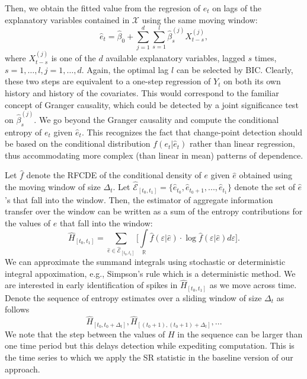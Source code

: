 Then, we obtain the fitted value from the regresion of $e_t$ on lags of the explanatory variables contained in $\mathcal{X}$ using the same moving window: 
\begin{equation}\label{eq:granger}
        \hat{e}_t = \hat{\beta}_0 + \sum\limits_{j=1}^{d}\sum\limits_{s=1}^{l} \hat{\beta}^{(j)}_{s}X_{t-s}^{(j)},
    \end{equation}
where $X_{t-s}^{(j)}$ is one of the $d$ available explanatory variables, lagged $s$ times, $s=1, \ldots, l, j=1, \ldots, d$. Again, the optimal lag $l$ can be selected by BIC. Clearly, these two steps are equivalent to a one-step regression of $Y_t$ on both its own history and history of the covariates. This would correspond to the familiar concept of Granger causality, which could be detected by a joint significance test on  $\hat{\beta}^{(j)}_{s}$.
We go beyond the Granger causality and compute the conditional entropy of $e_t$ given $\hat{e}_t$. This recognizes the fact that change-point detection should be based on the conditional distribution $f(e_t|\hat{e}_t)$ rather than linear regression, thus accommodating more complex (than linear in mean) patterns of dependence. 

Let $\hat{f}$ denote the RFCDE of the conditional density of $e$ given $\hat{e}$ obtained using the moving window of size $\Delta_t$. Let  $\hat{\mathcal{E}}_{[t_0, t_1]} = \{\hat{e}_{t_0}, \hat{e}_{t_0+1}, ..., \hat{e}_{t_1}  \}$ denote the set of $\hat{e}$'s that fall into the window. Then, the estimator of aggregate information transfer over the window can be written as a sum of the entropy contributions for the values of $\hat{e}$ that fall into the window: 
 \begin{equation}\label{eq:simpson}
        \hat{H}_{[t_0, t_1]} = \sum\limits_{\hat{e} \in \hat{\mathcal{E}}_{[t_0, t_1]}} \bigg[\int\limits_{\mathbb{R}}  \hat{f}(\varepsilon| \hat{e}) \cdot \log \hat{f}(\varepsilon| \hat{e}) d \varepsilon\bigg].
    \end{equation}
We can approximate the summand integrals using stochastic or deterministic integral appoximation, e.g., Simpson's rule which is a deterministic method. We are interested in early identification of spikes in $\hat{H}_{[t_0, t_1]}$ as we move across time. Denote the sequence of entropy estimates over a sliding window of size $\Delta_t$ as follows
    \begin{equation*}
        \hat{H}_{[t_0, t_0 + \Delta_t]}, \hat{H}_{[(t_0+1), (t_0+1) + \Delta_t]}, ...    \end{equation*}
We note that the step between the values of $H$ in the sequence can be larger than one time period but this delays detection while expediting computation. This is the time series to which we apply the SR statistic in the baseline version of our approach. 

